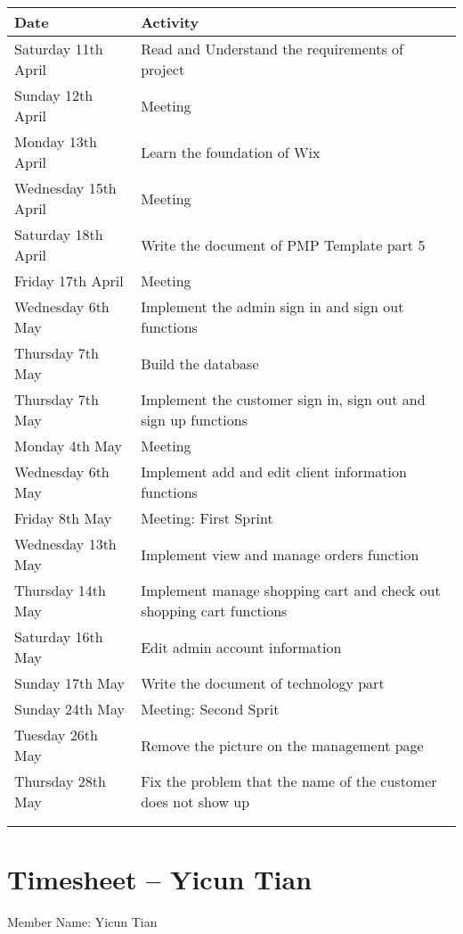 \begin{tabularx}{0.95\linewidth}{%
	l%
	>{\raggedright\arraybackslash}X}%
	\toprule
	Date & Activity\\
	\midrule
	Saturday 11th April & Read and Understand the requirements of project\\
	\midrule
	Sunday 12th April & Meeting\\
	\midrule
	Monday 13th April & Learn the foundation of Wix\\
	\midrule
	Wednesday 15th April & Meeting\\
	\midrule
	Saturday 18th April & Write the document of PMP Template part 5\\
	\midrule
	Friday 17th April & Meeting\\
	\midrule
	Wednesday 6th May & Implement the admin sign in and sign out functions\\
	\midrule
	Thursday 7th May & Build the database \\
	\midrule
	Thursday 7th May & Implement the customer sign in, sign out and sign up functions \\
	\midrule
	Monday 4th May & Meeting\\
	\midrule
	Wednesday 6th May & Implement add and edit client information functions\\
	\midrule
	Friday 8th May & Meeting: First Sprint\\
	\midrule
	Wednesday 13th May & Implement view and manage orders function\\
	\midrule
	Thursday 14th May & Implement manage shopping cart and check out shopping cart functions\\
	\midrule
	Saturday 16th May & Edit admin account information\\
	\midrule
	Sunday 17th May & Write the document of technology part\\
	\midrule
	Sunday 24th May & Meeting: Second Sprit\\
	\midrule
	Tuesday 26th May & Remove the picture on the management page\\
	\midrule
	Thursday 28th May & Fix the problem that the name of the customer does not show up\\
	\bottomrule
	\\
	\caption{Timesheet -- Pin Wang}  
	\label{tab:timesheetPin}
\end{tabularx}

\clearpage
\section*{Timesheet – Yicun Tian}
Member Name: Yicun Tian

